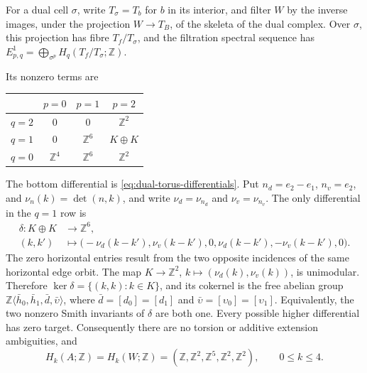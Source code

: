 \documentclass[11pt]{article}
\theoremstyle{definition}
\theoremstyle{remark}
\numberwithin{equation}{section}
\begin{document}
For a dual cell $\sigma$, write $T_\sigma=T_b$ for $b$ in its interior,
and filter $W$ by the inverse images, under the projection $W\to T_B$, of
the skeleta of the dual complex.  Over $\sigma$, this projection has fibre
$T_f/T_\sigma$, and the filtration spectral sequence has
$E^1_{p,q}=\bigoplus_{\sigma^p}H_q(T_f/T_\sigma;\mathbb Z)$.
\begin{samepage}
Its nonzero terms are
\begin{center}
\begin{tabular}{c@{\quad}ccc}
\toprule
 & $p=0$ & $p=1$ & $p=2$\\
\midrule
$q=2$ & 0 & 0 & $\mathbb Z^2$\\
$q=1$ & 0 & $\mathbb Z^6$ & $K\oplus K$\\
$q=0$ & $\mathbb Z^4$ & $\mathbb Z^6$ & $\mathbb Z^2$\\
\bottomrule
\end{tabular}
\end{center}
\end{samepage}
The bottom differential is \eqref{eq:dual-torus-differentials}.  Put
$n_d=e_2-e_1$, $n_v=e_2$, and $\nu_n(k)=\det(n,k)$, and write
$\nu_d=\nu_{n_d}$ and $\nu_v=\nu_{n_v}$.
The only differential in the $q=1$ row is
\begin{equation*}
 \begin{split}
 \delta:K\oplus K&\longrightarrow\mathbb Z^6,\\
 (k,k')&\longmapsto
 \bigl(-\nu_d(k-k'),\nu_v(k-k'),0,
       \nu_d(k-k'),-\nu_v(k-k'),0\bigr).
 \end{split}
\end{equation*}
The zero horizontal entries result from the two opposite incidences of the
same horizontal edge orbit.  The map
$K\to\mathbb Z^2$, $k\mapsto(\nu_d(k),\nu_v(k))$, is unimodular.
Therefore $\ker\delta=\{(k,k):k\in K\}$, and its cokernel is the free
abelian group
$\mathbb Z\langle\bar h_0,\bar h_1,\bar d,\bar\upsilon\rangle$, where
$\bar d=[d_0]=[d_1]$ and
$\bar\upsilon=[\upsilon_0]=[\upsilon_1]$.
Equivalently, the two nonzero Smith invariants of $\delta$ are both one.
Every possible higher differential has zero target.  Consequently there
are no torsion or additive extension ambiguities, and
\begin{equation}\label{eq:cusp-homology}
 H_k(A;\mathbb Z)=H_k(W;\mathbb Z)=
 (\mathbb Z,\mathbb Z^2,\mathbb Z^5,
   \mathbb Z^2,\mathbb Z^2),\qquad 0\le k\le4.
\end{equation}%
\end{document}
